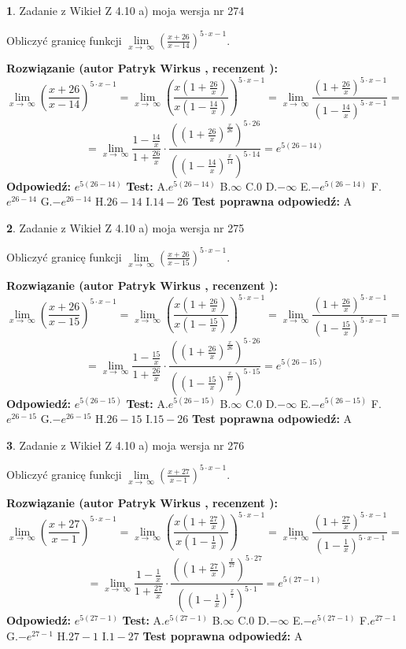 \documentclass[12pt, a4paper]{article}
\theoremstyle{definition} %
\newtheorem{zad}{}
\newcommand{\zadStart}[1]{\begin{zad}#1\newline}
\newcommand{\zadStop}{\end{zad}}
\newcommand{\rozwStart}[2]{\noindent \textbf{Rozwiązanie (autor #1 , recenzent #2): }\newline}
\newcommand{\rozwStop}{\newline}
\newcommand{\odpStart}{\noindent \textbf{Odpowiedź:}\newline}
\newcommand{\odpStop}{\newline}
\newcommand{\testStart}{\noindent \textbf{Test:}\newline}
\newcommand{\testStop}{\newline}
\newcommand{\kluczStart}{\noindent \textbf{Test poprawna odpowiedź:}\newline}
\newcommand{\kluczStop}{\newline}
\begin{document}
\zadStart{Zadanie z Wikieł Z 4.10 a) moja wersja nr 274}


Obliczyć granicę funkcji  $\lim\limits_{x\to\ \infty}(\frac{x+26}{x-14})^{5\cdot x-1}$.
\zadStop
\rozwStart{Patryk Wirkus}{}
$$\lim\limits_{x\to\ \infty}(\frac{x+26}{x-14})^{5\cdot x-1} = \lim\limits_{x\to\ \infty}(\frac{x(1+\frac{26}{x})}{x(1-\frac{14}{x})})^{5\cdot x-1}=\lim\limits_{x\to\ \infty}\frac{(1+\frac{26}{x})^{5\cdot x-1}}{(1-\frac{14}{x})^{5\cdot x-1}}=$$
$$=\lim\limits_{x\to\ \infty}\frac{1-\frac{14}{x}}{1+\frac{26}{x}}\cdot\frac{((1+\frac{26}{x})^{\frac{x}{26}})^{5\cdot26}}{((1-\frac{14}{x})^{\frac{x}{14}})^{5\cdot14}}=e^{5(26-14)}$$
\rozwStop
\odpStart
$e^{5(26-14)}$
\odpStop
\testStart
A.$e^{5(26-14)}$ B.$\infty$ C.$0$ D.$-\infty$ E.$-e^{5(26-14)}$
F.$e^{26-14}$ G.$-e^{26-14}$
H.$26-14$
I.$14-26$
\testStop
\kluczStart
A
\kluczStop



\zadStart{Zadanie z Wikieł Z 4.10 a) moja wersja nr 275}


Obliczyć granicę funkcji  $\lim\limits_{x\to\ \infty}(\frac{x+26}{x-15})^{5\cdot x-1}$.
\zadStop
\rozwStart{Patryk Wirkus}{}
$$\lim\limits_{x\to\ \infty}(\frac{x+26}{x-15})^{5\cdot x-1} = \lim\limits_{x\to\ \infty}(\frac{x(1+\frac{26}{x})}{x(1-\frac{15}{x})})^{5\cdot x-1}=\lim\limits_{x\to\ \infty}\frac{(1+\frac{26}{x})^{5\cdot x-1}}{(1-\frac{15}{x})^{5\cdot x-1}}=$$
$$=\lim\limits_{x\to\ \infty}\frac{1-\frac{15}{x}}{1+\frac{26}{x}}\cdot\frac{((1+\frac{26}{x})^{\frac{x}{26}})^{5\cdot26}}{((1-\frac{15}{x})^{\frac{x}{15}})^{5\cdot15}}=e^{5(26-15)}$$
\rozwStop
\odpStart
$e^{5(26-15)}$
\odpStop
\testStart
A.$e^{5(26-15)}$ B.$\infty$ C.$0$ D.$-\infty$ E.$-e^{5(26-15)}$
F.$e^{26-15}$ G.$-e^{26-15}$
H.$26-15$
I.$15-26$
\testStop
\kluczStart
A
\kluczStop



\zadStart{Zadanie z Wikieł Z 4.10 a) moja wersja nr 276}


Obliczyć granicę funkcji  $\lim\limits_{x\to\ \infty}(\frac{x+27}{x-1})^{5\cdot x-1}$.
\zadStop
\rozwStart{Patryk Wirkus}{}
$$\lim\limits_{x\to\ \infty}(\frac{x+27}{x-1})^{5\cdot x-1} = \lim\limits_{x\to\ \infty}(\frac{x(1+\frac{27}{x})}{x(1-\frac{1}{x})})^{5\cdot x-1}=\lim\limits_{x\to\ \infty}\frac{(1+\frac{27}{x})^{5\cdot x-1}}{(1-\frac{1}{x})^{5\cdot x-1}}=$$
$$=\lim\limits_{x\to\ \infty}\frac{1-\frac{1}{x}}{1+\frac{27}{x}}\cdot\frac{((1+\frac{27}{x})^{\frac{x}{27}})^{5\cdot27}}{((1-\frac{1}{x})^{\frac{x}{1}})^{5\cdot1}}=e^{5(27-1)}$$
\rozwStop
\odpStart
$e^{5(27-1)}$
\odpStop
\testStart
A.$e^{5(27-1)}$ B.$\infty$ C.$0$ D.$-\infty$ E.$-e^{5(27-1)}$
F.$e^{27-1}$ G.$-e^{27-1}$
H.$27-1$
I.$1-27$
\testStop
\kluczStart
A
\kluczStop
\end{document}
